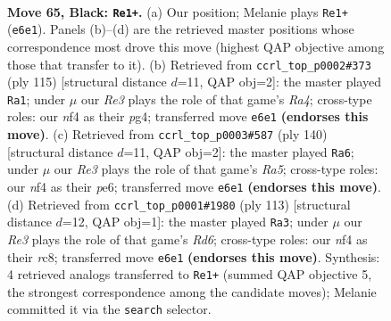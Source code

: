 \documentclass[11pt]{article}
\begin{document}
\clearpage

\begin{figure}[p]\centering
\begin{subfigure}{0.46\textwidth}\centering
\resizebox{\linewidth}{!}{%
\newchessgame
\chessboard[
  setfen={8/1k6/4r3/RP6/5N2/8/6P1/1K6 b - - 0 65},
  showmover=false,
  pgfstyle=straightmove, color=movearrow, markmove={e6-e1}
]}
\caption{}
\end{subfigure}\hfill
\begin{subfigure}{0.46\textwidth}\centering
\resizebox{\linewidth}{!}{%
\newchessgame
\chessboard[
  setfen={8/6k1/4R1P1/r7/5KP1/8/8/8 b - - 0 58},
  showmover=false,
  pgfstyle=straightmove, color=movearrow, markmove={a5-a1}
]}
\caption{}
\end{subfigure}
\\[4pt]
\begin{subfigure}{0.46\textwidth}\centering
\resizebox{\linewidth}{!}{%
\newchessgame
\chessboard[
  setfen={8/8/4p1r1/R7/4k3/6p1/6K1/8 w - - 30 71},
  showmover=false,
  pgfstyle=straightmove, color=movearrow, markmove={a5-a6}
]}
\caption{}
\end{subfigure}\hfill
\begin{subfigure}{0.46\textwidth}\centering
\resizebox{\linewidth}{!}{%
\newchessgame
\chessboard[
  setfen={2R5/k7/P7/8/2P5/3r4/4K3/8 b - - 12 57},
  showmover=false,
  pgfstyle=straightmove, color=movearrow, markmove={d3-a3}
]}
\caption{}
\end{subfigure}
\caption{\textbf{Move 65, Black: \texttt{Re1+}.} (a) Our position; Melanie plays \texttt{Re1+} (\texttt{e6e1}). Panels (b)--(d) are the retrieved master positions whose correspondence most drove this move (highest QAP objective among those that transfer to it). (b) Retrieved from \texttt{ccrl\_top\_p0002\#373} (ply 115) [structural distance $d$=11, QAP obj=2]: the master played \texttt{Ra1}; under $\mu$ our \emph{Re3} plays the role of that game's \emph{Ra4}; cross-type roles: our \emph{n}f4 as their \emph{p}g4; transferred move \texttt{e6e1} \textbf{(endorses this move)}. (c) Retrieved from \texttt{ccrl\_top\_p0003\#587} (ply 140) [structural distance $d$=11, QAP obj=2]: the master played \texttt{Ra6}; under $\mu$ our \emph{Re3} plays the role of that game's \emph{Ra5}; cross-type roles: our \emph{n}f4 as their \emph{p}e6; transferred move \texttt{e6e1} \textbf{(endorses this move)}. (d) Retrieved from \texttt{ccrl\_top\_p0001\#1980} (ply 113) [structural distance $d$=12, QAP obj=1]: the master played \texttt{Ra3}; under $\mu$ our \emph{Re3} plays the role of that game's \emph{Rd6}; cross-type roles: our \emph{n}f4 as their \emph{r}c8; transferred move \texttt{e6e1} \textbf{(endorses this move)}. Synthesis: 4 retrieved analogs transferred to \texttt{Re1+} (summed QAP objective 5, the strongest correspondence among the candidate moves); Melanie committed it via the \texttt{search} selector.}
\label{fig:thought-m129}
\end{figure}
\end{document}
